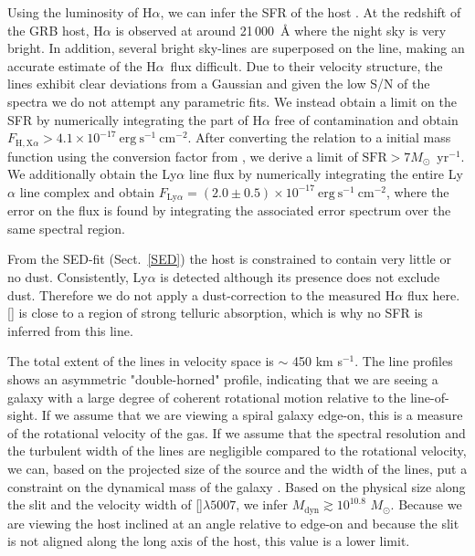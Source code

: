 \documentclass[referee]{aa}
\newcommand{\lya}{Ly$\alpha$}
\newcommand{\ha}{H$\alpha$}
\newcommand{\oii}{[\ion{O}{ii}]}
\newcommand{\oiii}{[\ion{O}{iii}]}
\begin{document}
Using the luminosity of \ha, we can infer the SFR of the host
\citep{Kennicutt1998}. At the redshift of the GRB host, \ha{} is observed at
around 21\,000~\AA{} where the night sky is very bright. In addition, several
bright sky-lines are superposed on the line, making an accurate estimate of the
\ha~flux difficult. Due to their velocity structure, the lines exhibit clear
deviations from a Gaussian and given the low S/N of the spectra we do not
attempt any parametric fits. We instead obtain a limit on the SFR by numerically
integrating the part of \ha{} free of contamination and obtain $F_{\mathrm{H,X} \alpha} >
4.1 \times 10^{-17}~\mathrm{erg}~\mathrm{s}^{-1}~\mathrm{cm}^{-2}$. After
converting the \citet{Kennicutt1998} relation to a \citet{Chabrier2003} initial
mass function using the conversion factor from \citet{Madau2014}, we derive a
limit of $\mathrm{SFR} > 7 M_\odot$~yr$^{-1}$. We additionally obtain the \lya{} line
flux by numerically integrating the entire \lya{} line complex and obtain
$F_{\mathrm{Ly}\alpha} = (2.0 \pm 0.5) \times 10^{-17}~\mathrm{erg}~
\mathrm{s}^{-1}~\mathrm{cm}^{-2}$, where the error on the flux is found by
integrating the associated error spectrum over the same spectral region.


From the SED-fit (Sect.~\ref{SED}) the host is constrained to contain very
little or no dust. Consistently, \lya{} is detected although its presence does
not exclude dust. Therefore we do not apply a dust-correction to the measured
\ha{} flux here. \oii{} is close to a region of strong telluric absorption,
which is why no SFR is inferred from this line.

The total extent of the lines in velocity space is $\sim$ 450 km s$^{-1}$. The line
profiles shows an asymmetric "double-horned" profile, indicating that we are
seeing a galaxy with a large degree of coherent rotational motion relative to
the line-of-sight. If we assume that we are viewing a spiral galaxy edge-on,
this is a measure of the rotational velocity of the gas. If we assume that the
spectral resolution and the turbulent width of the lines are negligible compared
to the rotational velocity, we can, based on the projected size of the source
and the width of the lines, put a constraint on the dynamical mass of the galaxy
\citep{DeBlok2014}. Based on the physical size along the slit and the velocity
width of \oiii$\lambda5007$, we infer $M_\text{dyn} \gtrsim 10^{10.8}$
$M_\odot$. Because we are viewing the host inclined at an angle relative to
edge-on and because the slit is not aligned along the long axis of the host,
this value is a lower limit. 
\end{document}
